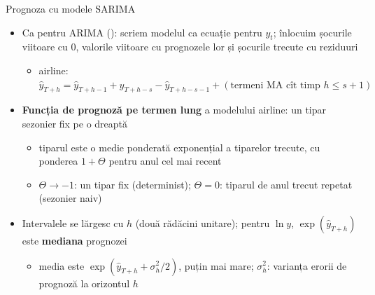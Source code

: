 \begin{frame}{Prognoza cu modele SARIMA}
\itemsize{\small}
\begin{itemize}
    \item Ca pentru ARIMA (): scriem modelul ca ecuație pentru $y_t$; înlocuim șocurile viitoare cu 0, valorile viitoare cu prognozele lor și șocurile trecute cu reziduuri
    \begin{itemize}
        \item airline: $\hat y_{T+h} = \hat y_{T+h-1} + \hat y_{T+h-s} - \hat y_{T+h-s-1} + (\text{termeni MA cît timp } h \le s + 1)$
    \end{itemize}
    \item \textbf{Funcția de prognoză pe termen lung} a modelului airline: un tipar sezonier fix pe o dreaptă
    \begin{itemize}
        \item tiparul este o medie ponderată exponențial a tiparelor trecute, cu ponderea $1 + \Theta$ pentru anul cel mai recent
        \item $\Theta \to -1$: un tipar fix (determinist); $\Theta = 0$: tiparul de anul trecut repetat (sezonier naiv)
    \end{itemize}
    \item Intervalele se lărgesc cu $h$ (două rădăcini unitare); pentru $\ln y$, $\exp(\hat y_{T+h})$ este \textbf{mediana} prognozei
    \begin{itemize}
        \item media este $\exp(\hat y_{T+h} + \sigma_h^2/2)$, puțin mai mare; $\sigma_h^2$: varianța erorii de prognoză la orizontul $h$
    \end{itemize}
\end{itemize}
\end{frame}

